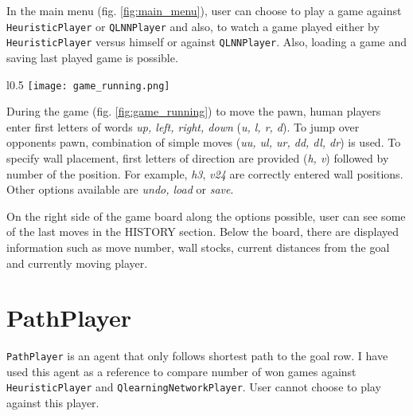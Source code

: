 In the main menu (fig. \ref{fig:main_menu}), user can choose to play a game
against {\lstinline{HeuristicPlayer}} or {\lstinline{QLNNPlayer}} and also,
to watch a game played either by {\lstinline{HeuristicPlayer}} versus himself
or against {\lstinline{QLNNPlayer}}. Also, loading a game and saving last
played game is possible.

\begin{wrapfigure}{l}{0.5\textwidth}
  \vspace*{-0.35cm}
  \centering
  \texttt{[image: game\_running.png]}
  \vspace*{-0.30cm}
  \caption{game running}
  \label{fig:game_running}
  \vspace*{-0.60cm}
\end{wrapfigure}

During the game (fig. \ref{fig:game_running}) to move the pawn, human players
enter first letters of words \textit{up, left, right, down}
(\textit{u, l, r, d}). To jump over opponents pawn, combination of simple
moves (\textit{uu, ul, ur, dd, dl, dr}) is used. To specify wall placement,
first letters of direction are provided (\textit{h, v}) followed by number
of the position.  For example, \textit{h3}, \textit{v24} are correctly entered
wall positions. Other options available are \textit{undo, load} or
\textit{save}.

On the right side of the game board along the options possible, user can see
some of the last moves in the HISTORY section. Below the board, there are
displayed information such as move number, wall stocks, current distances from
the goal and currently moving player.

\section{PathPlayer}
{\lstinline{PathPlayer}} is an agent that only follows shortest path to the
goal row. I have used this agent as a reference to compare number of won games
against {\lstinline{HeuristicPlayer}} and {\lstinline{QlearningNetworkPlayer}}.
User cannot choose to play against this player.

